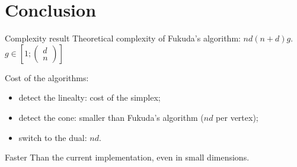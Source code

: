 \section{Conclusion}
\begin{frame}{Complexity result}
Theoretical complexity of Fukuda's algorithm: $nd(n+d)g$. $g\in [1;
\begin{pmatrix}
 d\\
 n 
 \end{pmatrix}]$

Cost of the algorithms:
\begin{itemize}
\item detect the linealty: cost of the simplex;
\item detect the cone: smaller than Fukuda's algorithm ($nd$ per vertex);
\item switch to the dual: $nd$.
\end{itemize} 

Faster Than the current implementation, even in small dimensions.

\end{frame}


